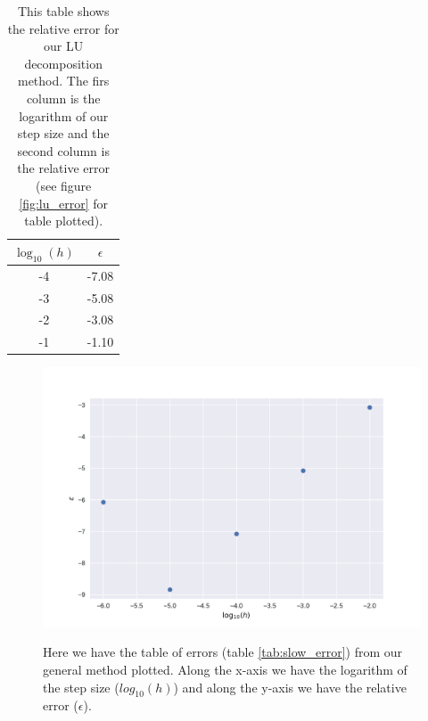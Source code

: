 \documentclass[reprint, english,notitlepage]{revtex4-1}  %
\begin{document}
\begin{table} [h]  %
	\begin{tabular}{||c | c||}
			\hline
			$\log_{10}(h)$ & $\epsilon$    \\ \hline
			-4 & -7.08    \\ \hline
			-3 & -5.08    \\ \hline
			-2 & -3.08    \\ \hline
			-1 & -1.10    \\ \hline
	\end{tabular}
	\caption{This table shows the relative error for our LU decomposition method. The firs column is the logarithm of our step size and the second column is the relative error (see figure \ref{fig:lu_error} for table plotted).}
	\label{tab:lu_error}
\end{table}


\begin{figure}[h]
	\centering
	\includegraphics[scale=0.5]{../output/slow_errors.pdf}
	\label{fig:slow_error}
	\caption{Here we have the table of errors (table \ref{tab:slow_error}) from our general method plotted. Along the x-axis we have the logarithm of the step size ($log_{10}(h)$) and along the y-axis we have the relative error ($\epsilon$).} 
\end{figure}
\end{document}
